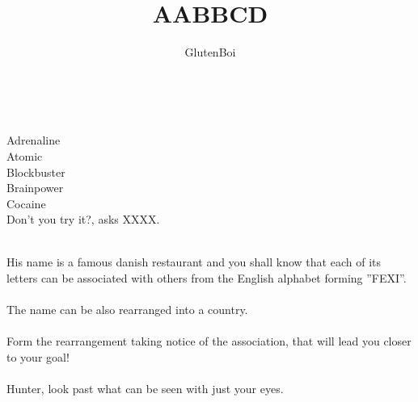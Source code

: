\documentclass[12pt,a4paper]{article}
\title{AABBCD}
\author{GlutenBoi}
\date{}
\begin{document}
\maketitle
\thispagestyle{empty}
\ \\
\begin{center}
Adrenaline\\
Atomic\\
Blockbuster\\
Brainpower\\
Cocaine\\
Don't you try it?, asks XXXX.\\
\end{center}
\ \\
His name is a famous danish restaurant and you shall know
that each of its letters can be associated with others from the English alphabet
forming ”FEXI”.\\
\ \\
The name can be also rearranged into a country. \\
\ \\
Form
the rearrangement taking notice of the association, that will lead you closer to your
goal!\\
\ \\
Hunter, look past what can be seen with just your eyes.
\end{document}
